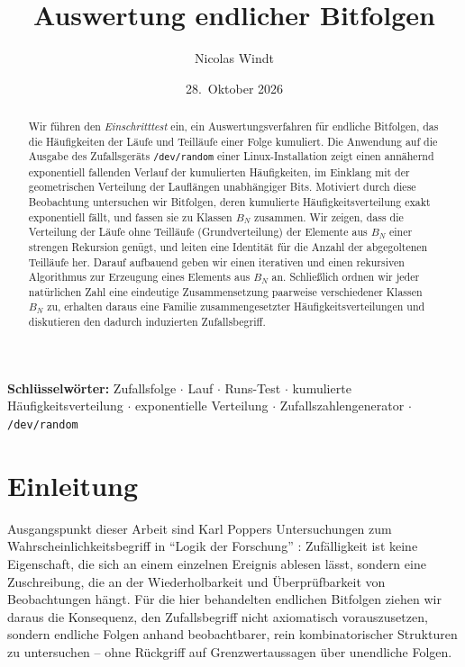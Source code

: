\documentclass[11pt,a4paper]{scrartcl}
\title{Auswertung endlicher Bitfolgen}
\author{Nicolas Windt}
\date{28.\ Oktober 2026}
\theoremstyle{plain}
\theoremstyle{definition}
\theoremstyle{remark}
\begin{document}
\maketitle

\begin{abstract}
Wir führen den \emph{Einschritttest} ein, ein Auswertungsverfahren für
endliche Bitfolgen, das die Häufigkeiten der Läufe und Teilläufe einer Folge
kumuliert. Die Anwendung auf die Ausgabe des Zufallsgeräts \texttt{/dev/random}
einer Linux-Installation zeigt einen annähernd exponentiell fallenden Verlauf
der kumulierten Häufigkeiten, im Einklang mit der geometrischen Verteilung der
Lauflängen unabhängiger Bits. Motiviert durch diese Beobachtung untersuchen
wir Bitfolgen, deren kumulierte Häufigkeitsverteilung exakt exponentiell
fällt, und fassen sie zu Klassen $B_N$ zusammen. Wir zeigen, dass die
Verteilung der Läufe ohne Teilläufe (Grundverteilung) der Elemente aus $B_N$
einer strengen Rekursion genügt, und leiten eine Identität für die Anzahl der
abgegoltenen Teilläufe her. Darauf aufbauend geben wir einen iterativen und
einen rekursiven Algorithmus zur Erzeugung eines Elements aus $B_N$ an.
Schließlich ordnen wir jeder natürlichen Zahl eine eindeutige Zusammensetzung
paarweise verschiedener Klassen $B_N$ zu, erhalten daraus eine Familie
zusammengesetzter Häufigkeitsverteilungen und diskutieren den dadurch
induzierten Zufallsbegriff.
\end{abstract}

\vspace{0.5em}
\noindent\textbf{Schlüsselwörter:}
Zufallsfolge $\cdot$ Lauf $\cdot$ Runs-Test $\cdot$ kumulierte Häufigkeitsverteilung
$\cdot$ exponentielle Verteilung $\cdot$ Zufallszahlengenerator $\cdot$ \texttt{/dev/random}

\section{Einleitung}\label{sec:einleitung}

Ausgangspunkt dieser Arbeit sind Karl Poppers Untersuchungen zum
Wahrscheinlichkeitsbegriff in \enquote{Logik der Forschung}
\cite{popper1935}: Zufälligkeit ist keine Eigenschaft, die sich an einem
einzelnen Ereignis ablesen lässt, sondern eine Zuschreibung, die an der
Wiederholbarkeit und Überprüfbarkeit von Beobachtungen hängt. Für die hier
behandelten endlichen Bitfolgen ziehen wir daraus die Konsequenz, den
Zufallsbegriff nicht axiomatisch vorauszusetzen, sondern endliche Folgen
anhand beobachtbarer, rein kombinatorischer Strukturen zu untersuchen --
ohne Rückgriff auf Grenzwertaussagen über unendliche Folgen.
\end{document}
